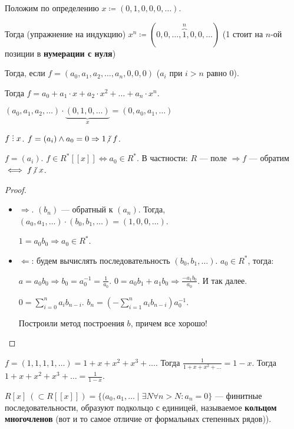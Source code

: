 \begin{remark}
    Положим по определению $x \coloneqq (0, 1, 0, 0, 0, \ldots)$. 

    Тогда (упражнение на индукцию) $x^n \coloneqq (0, 0,\ldots, \overbrace{1}^n, 0, 0, \ldots)$ (1 стоит на $n$-ой позиции в \textbf{нумерации с нуля}) 

    Тогда, если $f= (a_0, a_1,a_2,\ldots,a_n, 0, 0, 0)$ ($a_i$ при  $i > n$ равно 0). 

    Тогда $f = a_0 + a_1 \cdot x + a_2 \cdot x^2 + \ldots + a_n \cdot x^n$. 
\end{remark}
\begin{remark}
    $(a_0, a_1, a_2,\ldots) \cdot \underbrace{(0, 1, 0,\ldots)}_{x} = (0, a_0, a_1, \ldots)$
\end{remark}
\begin{consequence}
    $f \divby x$.  $f = (a_i) \land a_0 = 0 \Rightarrow 1 \centernot \divby f$. 
\end{consequence}
\begin{theorem}
	$f = (a_i)$.  $f \in R^*[[x]] \iff a_0 \in R^*$. В частности: $R$ --- поле  $\Rightarrow f$ --- обратим $\iff f \centernot \divby x$. 
\end{theorem}
\begin{proof}
    \slashn
     \begin{itemize}
         \item $\Rightarrow$. $(b_n)$ --- обратный к  $(a_n)$. Тогда,  $(a_0, a_1, \ldots) \cdot (b_0, b_1, \ldots) = (1, 0, 0,\ldots)$.

             $1 = a_0b_0 \Rightarrow a_0\in R^*$.
         \item $\Leftarrow$: будем вычислять последовательность  $(b_0, b_1,\ldots)$. $a_0 \in R^*$, тогда: 

             $a = a_0b_0 \Rightarrow b_0 = a_0^{-1} = \frac{1}{a_0}$. $0 = a_0b_1 + a_1b_0 \Rightarrow \frac{-a_1b_0}{a_0}$. И так далее.

             $0 = \sum_{i=0}^n a_i b_{n-i}$.  $b_n = (-\sum_{i=1}^n a_i b_{n-i})a_0^{-1}$.  

             Построили метод построения $b$, причем все хорошо!
    \end{itemize}
\end{proof}
\begin{example}
    $f = (1, 1, 1, 1, \ldots) = 1+x+x^2+x^3+\ldots$. Тогда $\frac{1}{1+x+x^2+\ldots} = 1-x$. Тогда $1+x+x^2+x^3+\ldots = \frac{1}{1-x}$.
\end{example}
\begin{theorem}
    $R[x]\ (\subset R[[x]]) = \{(a_0,a_1,\ldots \mid \exists N \forall n > N\!: a_n=0\}$ --- финитные последовательности, образуют подкольцо с единицей, называемое \textbf{кольцом многочленов} (вот и то самое отличие от формальных степенных рядов)).
\end{theorem}
